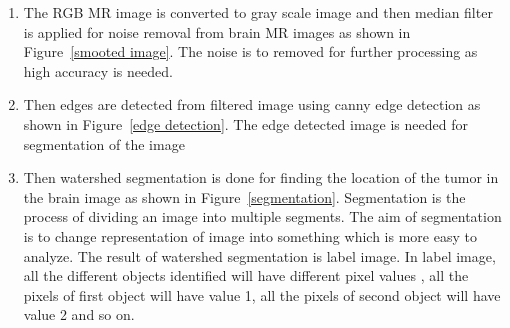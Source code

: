 \documentclass[10pt]{report}
\begin{document}
	\begin{enumerate}
		\item The  RGB  MR    image  is  converted  to  gray  scale image  and
			then  median  filter  is  applied  for  noise  removal from brain MR
			images as shown in Figure~\ref{smooted image}. The noise is to removed for further
			processing as high accuracy is needed.

		\item Then  edges  are  detected  from  filtered  image  using canny
			edge  detection  as  shown  in  Figure~\ref{edge detection}.  The  edge detected
			image is needed for segmentation of  the image

		\item Then  watershed  segmentation  is  done  for  finding the
			location  of  the  tumor  in  the  brain  image  as  shown  in
			Figure~\ref{segmentation}. Segmentation is  the process of dividing  an image into
			multiple segments. The aim of segmentation is to change
			representation  of    image  into  something  which  is more  easy
			to  analyze.  The result  of  watershed  segmentation is  label
			image.    In  label  image,  all  the  different  objects identified
			will  have  different  pixel  values  ,  all  the  pixels  of first
			object  will have value 1, all the pixels of second object will have
			value 2 and so on.
	\end{enumerate}
\end{document}
